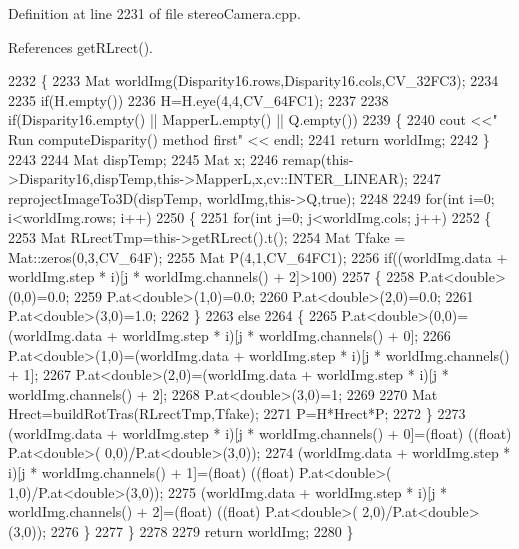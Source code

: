 Definition at line 2231 of file stereo\+Camera.\+cpp.



References get\+R\+Lrect().


\begin{DoxyCode}
2232 \{
2233     Mat worldImg(Disparity16.rows,Disparity16.cols,CV\_32FC3);
2234 
2235     \textcolor{keywordflow}{if}(H.empty())
2236         H=H.eye(4,4,CV\_64FC1);
2237 
2238     \textcolor{keywordflow}{if}(Disparity16.empty() || MapperL.empty() || Q.empty())
2239     \{
2240         cout <<\textcolor{stringliteral}{" Run computeDisparity() method first"} << endl;
2241         \textcolor{keywordflow}{return} worldImg;
2242     \}
2243 
2244     Mat dispTemp;
2245     Mat x;
2246     remap(this->Disparity16,dispTemp,this->MapperL,x,cv::INTER\_LINEAR);
2247     reprojectImageTo3D(dispTemp, worldImg,this->Q,\textcolor{keyword}{true});
2248 
2249     \textcolor{keywordflow}{for}(\textcolor{keywordtype}{int} i=0; i<worldImg.rows; i++)
2250     \{
2251         \textcolor{keywordflow}{for}(\textcolor{keywordtype}{int} j=0; j<worldImg.cols; j++)
2252         \{
2253             Mat RLrectTmp=this->getRLrect().t();
2254             Mat Tfake = Mat::zeros(0,3,CV\_64F);
2255             Mat P(4,1,CV\_64FC1);
2256             \textcolor{keywordflow}{if}((worldImg.data + worldImg.step * i)[j * worldImg.channels() + 2]>100)
2257             \{
2258                 P.at<\textcolor{keywordtype}{double}>(0,0)=0.0;
2259                 P.at<\textcolor{keywordtype}{double}>(1,0)=0.0;
2260                 P.at<\textcolor{keywordtype}{double}>(2,0)=0.0;
2261                 P.at<\textcolor{keywordtype}{double}>(3,0)=1.0;
2262             \}
2263             \textcolor{keywordflow}{else}
2264             \{
2265                 P.at<\textcolor{keywordtype}{double}>(0,0)=(worldImg.data + worldImg.step * i)[j * worldImg.channels() + 0];
2266                 P.at<\textcolor{keywordtype}{double}>(1,0)=(worldImg.data + worldImg.step * i)[j * worldImg.channels() + 1];
2267                 P.at<\textcolor{keywordtype}{double}>(2,0)=(worldImg.data + worldImg.step * i)[j * worldImg.channels() + 2];
2268                 P.at<\textcolor{keywordtype}{double}>(3,0)=1;
2269 
2270                 Mat Hrect=buildRotTras(RLrectTmp,Tfake);
2271                 P=H*Hrect*P;
2272             \}
2273             (worldImg.data + worldImg.step * i)[j * worldImg.channels() + 0]=(float) ((\textcolor{keywordtype}{float}) P.at<\textcolor{keywordtype}{double}>(
      0,0)/P.at<\textcolor{keywordtype}{double}>(3,0));
2274             (worldImg.data + worldImg.step * i)[j * worldImg.channels() + 1]=(float) ((\textcolor{keywordtype}{float}) P.at<\textcolor{keywordtype}{double}>(
      1,0)/P.at<\textcolor{keywordtype}{double}>(3,0));
2275             (worldImg.data + worldImg.step * i)[j * worldImg.channels() + 2]=(float) ((\textcolor{keywordtype}{float}) P.at<\textcolor{keywordtype}{double}>(
      2,0)/P.at<\textcolor{keywordtype}{double}>(3,0));
2276         \}
2277     \}
2278 
2279     \textcolor{keywordflow}{return} worldImg;
2280 \}
\end{DoxyCode}
\mbox{\label{classStereoCamera_a6580ff03c7cec5c385ec717f9c018e21}} 
